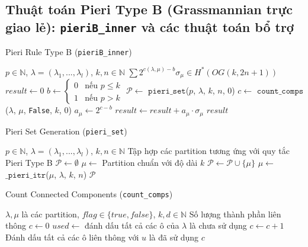 
\subsection*{Thuật toán Pieri Type B (Grassmannian trực giao lẻ): \texttt{pieriB\_inner} và các thuật toán bổ trợ}

\begin{algorithm}[H]
\caption{Pieri Rule Type B (\texttt{pieriB\_inner})}
\begin{algorithmic}[1]
\REQUIRE $p \in \mathbb{N}$, $\lambda = (\lambda_1, ..., \lambda_l)$, $k, n \in \mathbb{N}$
\ENSURE $\sum 2^{c(\lambda,\mu)-b} \sigma_\mu \in H^*(OG(k,2n+1))$
\STATE $result \gets 0$
\STATE $b \gets \begin{cases}0 & \text{nếu } p \leq k \\ 1 & \text{nếu } p > k\end{cases}$
\STATE $\mathcal{P} \gets$ $\mathtt{pieri\_set}$($p$, $\lambda$, $k$, $n$, $0$)
    \STATE $c \gets$ $\mathtt{count\_comps}$($\lambda$, $\mu$, \texttt{False}, $k$, $0$)
    \STATE $a_\mu \gets 2^{c-b}$
    \STATE $result \gets result + a_\mu \cdot \sigma_\mu$
\ENDFOR
\RETURN $result$
\end{algorithmic}
\end{algorithm}

\begin{algorithm}[H]
    \caption{Pieri Set Generation (\texttt{pieri\_set})}
    \begin{algorithmic}[1]
    \REQUIRE $p \in \mathbb{N}$, $\lambda = (\lambda_1, ..., \lambda_l)$, $k, n \in \mathbb{N}$
    \ENSURE Tập hợp các partition tương ứng với quy tắc Pieri Type B
    \STATE $\mathcal{P} \gets \emptyset$
    \STATE $\mu \gets$ Partition chuẩn với độ dài $k$
    \WHILE{$\mu \neq \emptyset$}
        \STATE $\mathcal{P} \gets \mathcal{P} \cup \{\mu\}$
        \STATE $\mu \gets$ $\mathtt{\_pieri\_itr}$($\mu$, $\lambda$, $k$, $n$)
    \ENDWHILE
    \RETURN $\mathcal{P}$
    \end{algorithmic}
    \end{algorithm}

\begin{algorithm}[H]
    \caption{Count Connected Components (\texttt{count\_comps})}
    \begin{algorithmic}[1]
    \REQUIRE $\lambda, \mu$ là các partition, $flag \in \{true, false\}$, $k, d \in \mathbb{N}$
    \ENSURE Số lượng thành phần liên thông
    \STATE $c \gets 0$
    \STATE $used \gets$ đánh dấu tất cả các ô của $\lambda$ là chưa sử dụng
            \STATE $c \gets c + 1$
            \STATE Đánh dấu tất cả các ô liên thông với $u$ là đã sử dụng
        \ENDIF
    \ENDFOR
    \RETURN $c$
    \end{algorithmic}
    \end{algorithm}

